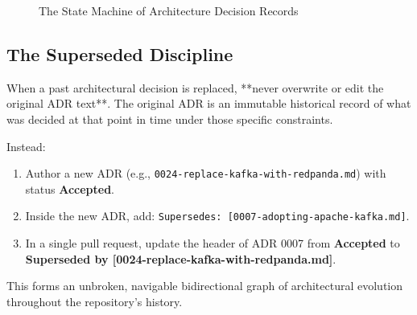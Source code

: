 \begin{figure}[htbp]
\centering
{}
\caption{The State Machine of Architecture Decision Records}
\label{fig:adr-lifecycle}
\end{figure}

\subsection{The Superseded Discipline}

When a past architectural decision is replaced, **never overwrite or edit the original ADR text**. The original ADR is an immutable historical record of what was decided at that point in time under those specific constraints.

Instead:
\begin{enumerate}[leftmargin=18pt]
  \item Author a new ADR (e.g., \texttt{0024-replace-kafka-with-redpanda.md}) with status \textbf{Accepted}.
  \item Inside the new ADR, add: \texttt{Supersedes: [0007-adopting-apache-kafka.md]}.
  \item In a single pull request, update the header of ADR 0007 from \textbf{Accepted} to \textbf{Superseded by [0024-replace-kafka-with-redpanda.md]}.
\end{enumerate}

This forms an unbroken, navigable bidirectional graph of architectural evolution throughout the repository's history.

